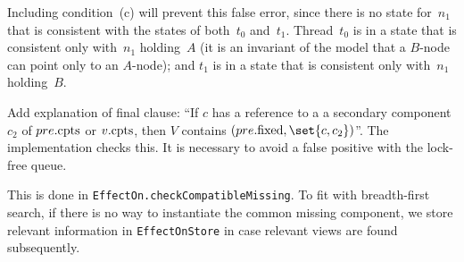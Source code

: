Including condition~(c) will prevent this false error, since there is no state
for~$n_1$ that is consistent with the states of both~$t_0$ and~$t_1$.
Thread~$t_0$ is in a state that is consistent only with~$n_1$ holding~$A$ (it
is an invariant of the model that a $B$-node can point only to an $A$-node);
and $t_1$ is in a state that is consistent only with~$n_1$ holding~$B$.



 Add explanation of final clause: ``If $c$ has a reference to
a a secondary component $c_2$ of $pre.\mathrm{cpts}$ or $v.\mathrm{cpts}$, then $V$ contains
$(pre.\fixed, \set{c, c_2})$''.  The implementation checks this.  It is
necessary to avoid a false positive with the lock-free queue.

\begin{impNote}
This is done in \texttt{EffectOn.\linebreak[1]check\-Compatible\-Missing}.  To
fit with breadth-first search, if there is no way to instantiate the common
missing component, we store relevant information in \texttt{EffectOnStore} in
case relevant views are found subsequently.
\end{impNote}
